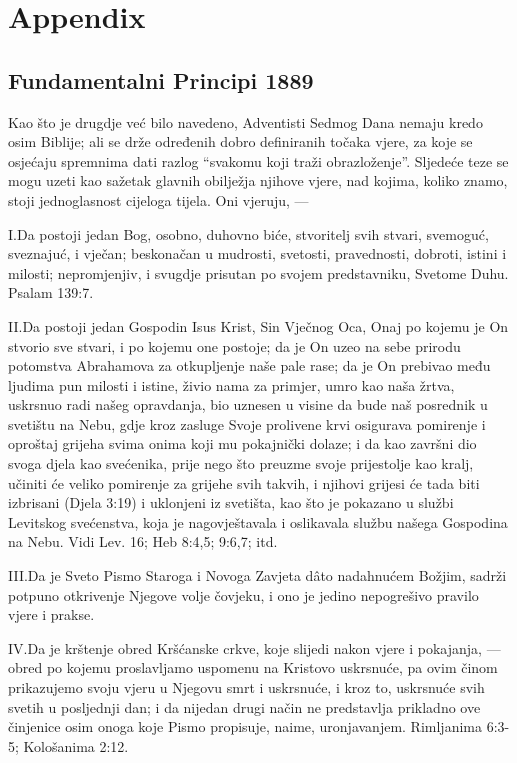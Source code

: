 \chapter*{Appendix} \label{chap:appendix}

\section*{Fundamentalni Principi 1889}

Kao što je drugdje već bilo navedeno, Adventisti Sedmog Dana nemaju kredo osim Biblije; ali se drže određenih dobro definiranih točaka vjere, za koje se osjećaju spremnima dati razlog “svakomu koji traži obrazloženje”. Sljedeće teze se mogu uzeti kao sažetak glavnih obilježja njihove vjere, nad kojima, koliko znamo, stoji jednoglasnost cijeloga tijela. Oni vjeruju, —

\lettrine{I.} Da postoji jedan Bog, osobno, duhovno biće, stvoritelj svih stvari, svemoguć, sveznajuć, i vječan; beskonačan u mudrosti, svetosti, pravednosti, dobroti, istini i milosti; nepromjenjiv, i svugdje prisutan po svojem predstavniku, Svetome Duhu. Psalam 139:7.

\lettrine{II.} Da postoji jedan Gospodin Isus Krist, Sin Vječnog Oca, Onaj po kojemu je On stvorio sve stvari, i po kojemu one postoje; da je On uzeo na sebe prirodu potomstva Abrahamova za otkupljenje naše pale rase; da je On prebivao među ljudima pun milosti i istine, živio nama za primjer, umro kao naša žrtva, uskrsnuo radi našeg opravdanja, bio uznesen u visine da bude naš posrednik u svetištu na Nebu, gdje kroz zasluge Svoje prolivene krvi osigurava pomirenje i oproštaj grijeha svima onima koji mu pokajnički dolaze; i da kao završni dio svoga djela kao svećenika, prije nego što preuzme svoje prijestolje kao kralj, učiniti će veliko pomirenje za grijehe svih takvih, i njihovi grijesi će tada biti izbrisani (Djela 3:19) i uklonjeni iz svetišta, kao što je pokazano u službi Levitskog svećenstva, koja je nagovještavala i oslikavala službu našega Gospodina na Nebu. Vidi Lev. 16; Heb 8:4,5; 9:6,7; itd.

\lettrine{III.} Da je Sveto Pismo Staroga i Novoga Zavjeta dâto nadahnućem Božjim, sadrži potpuno otkrivenje Njegove volje čovjeku, i ono je jedino nepogrešivo pravilo vjere i prakse.

\lettrine{IV.} Da je krštenje obred Kršćanske crkve, koje slijedi nakon vjere i pokajanja, — obred po kojemu proslavljamo uspomenu na Kristovo uskrsnuće, pa ovim činom prikazujemo svoju vjeru u Njegovu smrt i uskrsnuće, i kroz to, uskrsnuće svih svetih u posljednji dan; i da nijedan drugi način ne predstavlja prikladno ove činjenice osim onoga koje Pismo propisuje, naime, uronjavanjem. Rimljanima 6:3-5; Kološanima 2:12.

